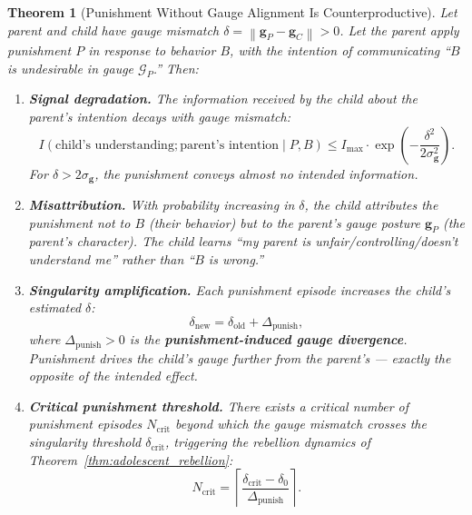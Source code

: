\documentclass[11pt,a4paper]{article}
\newtheorem{theorem}{Theorem}[section]
\newcommand{\cG}{\mathcal{G}}
\newcommand{\norm}[1]{\left\lVert#1\right\rVert}
\begin{document}
\begin{theorem}[Punishment Without Gauge Alignment Is Counterproductive]
\label{thm:punishment_failure}
Let parent and child have gauge mismatch $\delta = \norm{\mathbf{g}_P - \mathbf{g}_C} > 0$. Let the parent apply punishment $P$ in response to behavior $B$, with the intention of communicating ``$B$ is undesirable in gauge $\cG_P$.'' Then:

\begin{enumerate}[label=(\roman*)]
    \item \textbf{Signal degradation.} The information received by the child about the parent's intention decays with gauge mismatch:
    \begin{equation}
        I(\text{child's understanding}; \text{parent's intention} \mid P, B) \leq I_{\text{max}} \cdot \exp\left(-\frac{\delta^2}{2\sigma_{\mathbf{g}}^2}\right).
    \end{equation}
    For $\delta > 2\sigma_{\mathbf{g}}$, the punishment conveys almost no intended information.

    \item \textbf{Misattribution.} With probability increasing in $\delta$, the child attributes the punishment not to $B$ (their behavior) but to the parent's gauge posture $\mathbf{g}_P$ (the parent's character). The child learns ``my parent is unfair/controlling/doesn't understand me'' rather than ``$B$ is wrong.''

    \item \textbf{Singularity amplification.} Each punishment episode increases the child's estimated $\delta$:
    \begin{equation}
        \delta_{\text{new}} = \delta_{\text{old}} + \Delta_{\text{punish}},
    \end{equation}
    where $\Delta_{\text{punish}} > 0$ is the \textbf{punishment-induced gauge divergence}. Punishment drives the child's gauge \textit{further} from the parent's — exactly the opposite of the intended effect.

    \item \textbf{Critical punishment threshold.} There exists a critical number of punishment episodes $N_{\text{crit}}$ beyond which the gauge mismatch crosses the singularity threshold $\delta_{\text{crit}}$, triggering the rebellion dynamics of Theorem~\ref{thm:adolescent_rebellion}:
    \begin{equation}
        N_{\text{crit}} = \left\lceil \frac{\delta_{\text{crit}} - \delta_0}{\Delta_{\text{punish}}} \right\rceil.
    \end{equation}
\end{enumerate}
\end{theorem}
\end{document}
